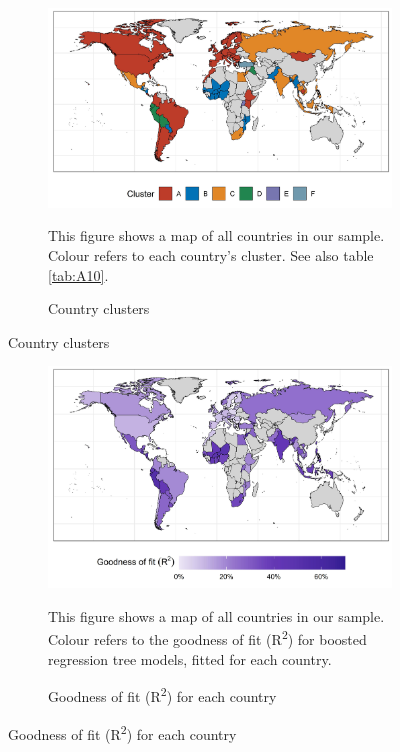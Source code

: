 \begin{figure}[ht!]
  \centering
  \caption{Overview of countries} \label{fig:Map}
  \begin{subfigure}[b]{\textwidth}
  \centering
    \caption{Country clusters} \label{fig:Map_1}
  \includegraphics{1_Figures/Figures_Appendix/Figure_Maps_1.jpg}
  \begin{subcaption2}
    This figure shows a map of all countries in our sample. Colour refers to each country's cluster. See also table \ref{tab:A10}.
  \end{subcaption2}
  \end{subfigure}
\end{figure}

\begin{figure}[ht!]\ContinuedFloat
   \begin{subfigure}[b]{\textwidth}
  \centering
      \caption{Goodness of fit (R\textsuperscript{2}) for each country} \label{fig:Map_2}
  \includegraphics{1_Figures/Figures_Appendix/Figure_Maps_2.jpg}
  \begin{subcaption2}
    This figure shows a map of all countries in our sample. Colour refers to the goodness of fit (R\textsuperscript{2}) for boosted regression tree models, fitted for each country.
  \end{subcaption2}
\end{subfigure}
\end{figure}

